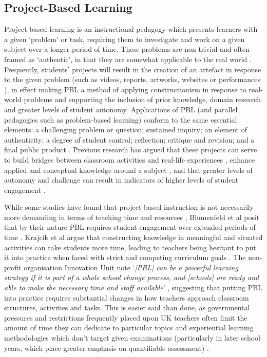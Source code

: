 \documentclass[,hyphens]{sigchi}
\begin{document}
\subsection{Project-Based Learning}
Project-based learning is an instructional pedagogy which presents learners with a given `problem' or task, requiring them to investigate and work on a given subject over a longer period of time. These problems are non-trivial and often framed as `authentic', in that they are somewhat applicable to the real world \cite{Blumenfeld1991}. Frequently, students' projects will result in the creation of an artefact in response to the given problem (such as videos, reports, artworks, websites or performances \cite{Holubova2008}), in effect making PBL a method of applying constructionism in response to real-world problems and supporting the inclusion of prior knowledge, domain research and greater levels of student autonomy. Applications of PBL (and parallel pedagogies such as problem-based learning) conform to the same essential elements: a challenging problem or question; sustained inquiry; an element of authenticity; a degree of student control; reflection; critique and revision; and a final public product \cite{Larmer2015}. Previous research has argued that these projects can serve to build bridges between classroom activities and real-life experiences \cite{Blumenfeld1991}, enhance applied and conceptual knowledge around a subject \cite{Boaler1999}, and that greater levels of autonomy and challenge can result in indicators of higher levels of student engagement \cite{Wurdinger2007}.

While some studies have found that project-based instruction is not necessarily more demanding in terms of teaching time and resources \cite{Al-Balushi2014}, Blumenfeld et al posit that by their nature PBL requires student engagement over extended periods of time \cite{Blumenfeld1991}. Krajcik et al argue that constructing knowledge in meaningful and situated activities can take students more time, leading to teachers being hesitant to put it into practice when faced with strict and competing curriculum goals \cite{Krajcik2006}. The non-profit organisation Innovation Unit note `\textit{[PBL] can be a powerful learning strategy if it is part of a whole school change process, and [schools] are ready and able to make the necessary time and staff available}' \cite{InnovationUnit2016}, suggesting that putting PBL into practice requires substantial changes in how teachers approach classroom structures, activities and tasks. This is easier said than done, as governmental pressures and restrictions frequently placed upon UK teachers often limit the amount of time they can dedicate to particular topics and experiential learning methodologies which don't target given examinations (particularly in later school years, which place greater emphasis on quantifiable assessment) \cite{Ofsted2018}.
\end{document}
